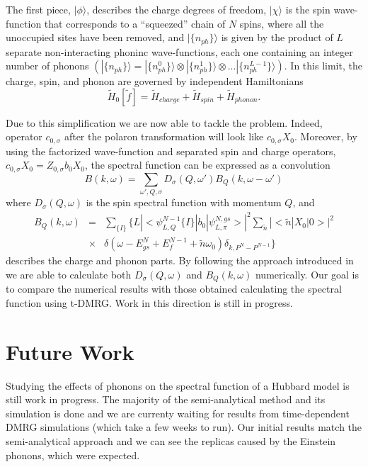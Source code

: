 \documentclass[article,11pt]{revtex4}
\begin{document}
The first piece, $|\phi\rangle$, describes the charge degrees of freedom, $|\chi\rangle$ is the spin wave-function that corresponds to a ``squeezed'' chain of $N$ spins, where all the unoccupied sites have been removed, and $|\{n_{ph}\}\rangle$ is given by the product of $L$ separate non-interacting phoninc wave-functions, each one containing an integer number of phonons $(|\{n_{ph}\}\rangle=|\{n_{ph}^0\}\rangle \otimes |\{n_{ph}^1\}\rangle \otimes ... |\{n_{ph}^{L-1}\}\rangle).$ In this limit, the charge, spin, and phonon are governed by independent Hamiltonians
\begin{equation}
\label{Htilde0} \tilde{H}_0[\tilde{f}] = \tilde{H}_{charge} +
\tilde{H}_{spin} + \tilde{H}_{phonon}.
\end{equation}

Due to this simplification we are now able to tackle the problem. Indeed, operator $c_{0,\sigma}$ after the polaron transformation will look like $c_{0,\sigma} X_0$. Moreover, by using the factorized wave-function and separated spin and charge operators, $c_{0,\sigma} X_0=Z_{0,\sigma} b_0 X_0$, the spectral function can be expressed as a convolution
\begin{equation}
\label{B_conv} B (k,\omega) = \sum\limits_{\omega ', Q, \sigma}
D_{\sigma} (Q,\omega ') B_Q (k,\omega - \omega ')
\end{equation}
where $D_{\sigma} (Q,\omega)$ is the spin spectral function with momentum $Q$, and
\begin{eqnarray}
\label{BQ_X} B_Q (k,\omega)&=& \sum\limits_{ \{ I \} } \{
L |<\psi_{L,Q}^{N-1}\{I\} | b_0 | \psi_{L,\pi}^{N,gs}>|^2 \sum\limits_{\tilde{n}} |<\tilde{n} | X_0 | 0>|^2 \\
&\times&\delta (\omega-E^N_{gs}+E^{N-1}_f+\tilde{n} \omega_0)  \delta_{k,P^N-P^{N-1}}\}\nonumber
\end{eqnarray}
describes the charge and phonon parts. By following the approach introduced in \cite{Penc1997b} we are able to calculate both $D_{\sigma} (Q,\omega)$ and $B_Q (k,\omega)$ numerically. Our goal is to compare the numerical results with those obtained calculating the spectral function using t-DMRG. Work in this direction is still in progress.

\pagebreak
\section{Future Work}

Studying the effects of phonons on the spectral function of a Hubbard model is still work in progress. The majority of the semi-analytical method and its simulation is done and we are currenty waiting for results from time-dependent DMRG simulations (which take a few weeks to run). Our initial results match the semi-analytical approach and we can see the replicas caused by the Einstein phonons, which were expected. 
\end{document}
